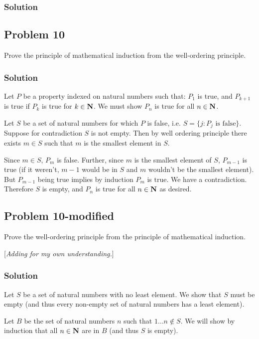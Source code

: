 \subsubsection*{Solution}

\subsection*{Problem 10}
Prove the principle of mathematical induction from the well-ordering principle.

\subsubsection*{Solution}
Let $P$ be a property indexed on natural numbers such that: $P_1$ is true, and $P_{k+1}$ is true if $P_k$ is true for $k\in\mathbf{N}$.
We must show $P_n$ is true for all $n\in\mathbf{N}$.

\vs

Let $S$ be a set of natural numbers for which $P$ is false, i.e. $S=\{j:P_j\text{ is false}\}$. Suppose for contradiction $S$ is not empty. Then by well ordering principle there exists $m\in S$ such that $m$ is the smallest element in $S$.

\vs

Since $m\in S$, $P_m$ is false. Further, since $m$ is the smallest element of $S$, $P_{m-1}$ is true (if it weren't, $m-1$ would be in $S$ and $m$ wouldn't be the smallest element). But $P_{m-1}$ being true implies by induction $P_m$ is true. We have a contradiction. Therefore $S$ is empty, and $P_n$ is true for all $n\in\mathbf{N}$ as desired.

\subsection*{Problem 10-modified}
Prove the well-ordering principle from the principle of mathematical induction.

[\textit{Adding for my own understanding.}]

\subsubsection*{Solution}
Let $S$ be a set of natural numbers with no least element. We show that $S$ must be empty (and thus every non-empty set of natural numbers has a least element).

\vs

Let $B$ be the set of natural numbers $n$ such that $1\ldots n\not\in S$. We will show by induction that all $n\in\mathbf{N}$ are in $B$ (and thus $S$ is empty).

